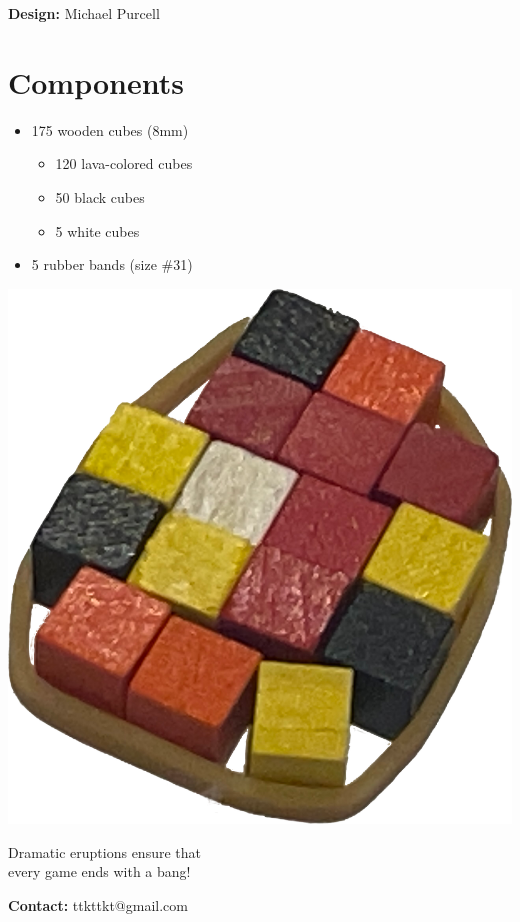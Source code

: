 \documentclass[a5paper, DIV=18, 12pt]{scrartcl}
\begin{document}
\begin{multicols}{2}
\vspace{3.0ex}

\textbf{Design:} Michael Purcell


\section*{\textcolor{eruption_purple}{Components}}
\begin{itemize}[leftmargin=*, nosep]
	\item 175 wooden cubes (8mm)
	\begin{itemize}[leftmargin=*, nosep]
	\vspace{0.9ex}
	  \item 120 lava-colored cubes
	  \vspace{0.9ex}
	  \item 50 black cubes
	  \vspace{0.9ex}
	  \item 5 white cubes
	\end{itemize}
	\vspace{0.9ex}
	\item 5 rubber bands (size \#31)
\end{itemize}

\vspace{6ex}

\qquad \includegraphics[width=0.55\columnwidth]{Images/eruption1.png}

\vspace{2ex}
Dramatic eruptions ensure that\\every game ends with a bang!  

\vfill{}

\textbf{Contact:} ttkttkt@gmail.com
\end{multicols}
\end{document}
